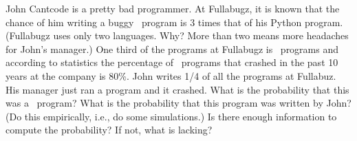 John Cantcode is a pretty bad programmer. 
At Fullabugz, it is known that the chance of him writing a buggy
\cpp\ program is 3 times that of his Python program.
(Fullabugz uses only two languages. Why?
More than two means more headaches for John's manager.)
One third of the programs at Fullabugz is \cpp\ programs
and according to statistics the percentage of \cpp\ programs that
crashed in the past 10 years at the company is 80\%.
John writes 1/4 of all the programs at Fullabuz.
His manager just ran a program and it crashed.
What is the probability that this was a \cpp\ program?
What is the probability that this program was written by John?
(Do this empirically, i.e., do some simulations.)
Is there enough information to compute the probability?
If not, what is lacking?
